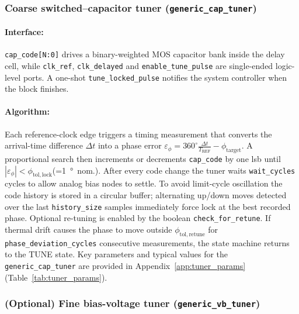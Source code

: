 \subsubsection{Coarse switched–capacitor tuner (\texttt{generic\_cap\_tuner})}
\paragraph{Interface:}

\texttt{cap\_code[N{:}0]} drives a binary-weighted MOS capacitor bank inside the delay cell,
while \texttt{clk\_ref}, \texttt{clk\_delayed} and \texttt{enable\_tune\_pulse} are single-ended logic-level ports.
A one-shot \texttt{tune\_locked\_pulse} notifies the system controller when the block finishes.

\paragraph{Algorithm:}

Each reference-clock edge triggers a timing measurement that converts the arrival-time difference
\(\Delta t\) into a phase error
\(\varepsilon_\phi = 360^\circ \tfrac{\Delta t}{T_{\mathrm{REF}}}-\phi_\mathrm{target}\).
A proportional search then increments or decrements \texttt{cap\_code} by one \gls{lsb}
until \(|\varepsilon_\phi|<\phi_\mathrm{tol,lock}\)\;(=\SI{1}{\degree}~nom.).
After every code change the tuner waits \texttt{wait\_cycles} cycles to allow analog
 bias nodes to settle.
To avoid limit-cycle oscillation the code history is stored in a circular buffer; alternating up/down moves
detected over the last \texttt{history\_size} samples immediately force lock at the best recorded phase.
Optional re-tuning is enabled by the boolean \texttt{check\_for\_retune}.
If thermal drift causes the phase to move outside \(\phi_\mathrm{tol,retune}\) for
\texttt{phase\_deviation\_cycles} consecutive measurements, the state machine returns to the TUNE state.
Key parameters and typical values for the \texttt{generic\_cap\_tuner} are provided in Appendix~\ref{app:tuner_params} (Table~\ref{tab:tuner_params}).


\subsubsection{(Optional) Fine bias-voltage tuner (\texttt{generic\_vb\_tuner})}
